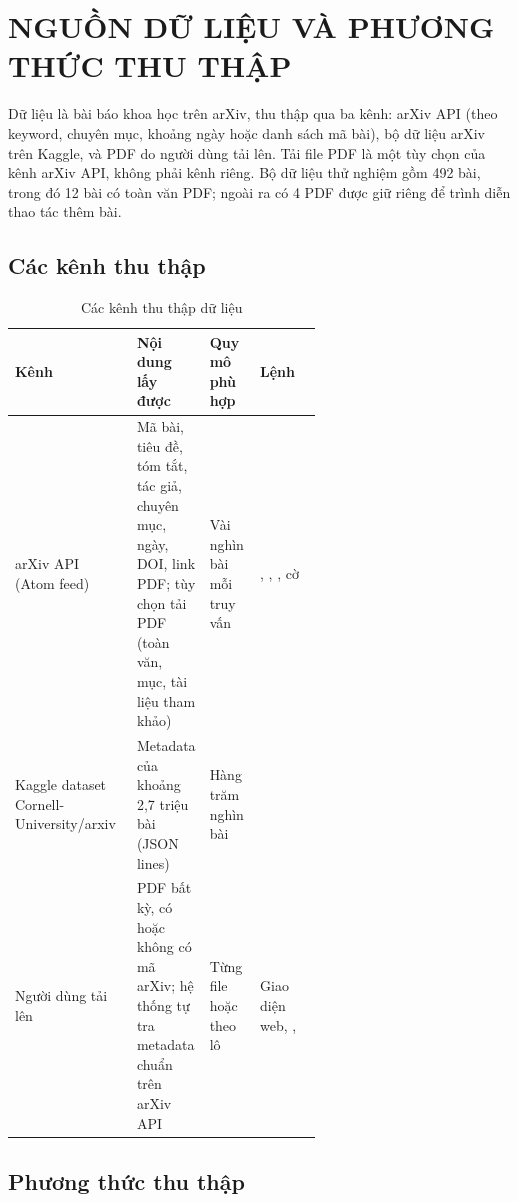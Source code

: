 \chapter{NGUỒN DỮ LIỆU VÀ PHƯƠNG THỨC THU THẬP}\label{chap:dulieu}

Dữ liệu là bài báo khoa học trên arXiv, thu thập qua ba kênh: arXiv API (theo keyword, chuyên mục, khoảng ngày
hoặc danh sách mã bài), bộ dữ liệu arXiv trên Kaggle, và PDF do người dùng tải lên. Tải file PDF là một tùy chọn
của kênh arXiv API, không phải kênh riêng. Bộ dữ liệu thử nghiệm gồm 492 bài, trong đó 12 bài có toàn văn PDF;
ngoài ra có 4 PDF được giữ riêng để trình diễn thao tác thêm bài.

\section{Các kênh thu thập}

\begin{table}[H]
\centering\small{}
\begin{tabularx}{\linewidth}{@{}P{0.2\linewidth}LP{0.17\linewidth}P{0.24\linewidth}@{}}
\toprule
\textbf{Kênh} & \textbf{Nội dung lấy được} & \textbf{Quy mô phù hợp} & \textbf{Lệnh}\\
\midrule
arXiv API~\cite{arxivapi} (Atom feed) & Mã bài, tiêu đề, tóm tắt, tác giả, chuyên mục, ngày, DOI, link PDF; tùy chọn tải PDF (toàn văn, mục, tài liệu tham khảo) & Vài nghìn bài mỗi truy vấn & , , , cờ \\
Kaggle dataset Cornell-University/arxiv~\cite{arxivdataset} & Metadata của khoảng 2,7 triệu bài (JSON lines) & Hàng trăm nghìn bài & \\
Người dùng tải lên & PDF bất kỳ, có hoặc không có mã arXiv; hệ thống tự tra metadata chuẩn trên arXiv API & Từng file hoặc theo lô & Giao diện web, , \\
\bottomrule
\end{tabularx}
\caption{Các kênh thu thập dữ liệu}\label{tab:kenh}
\end{table}

\section{Phương thức thu thập}

